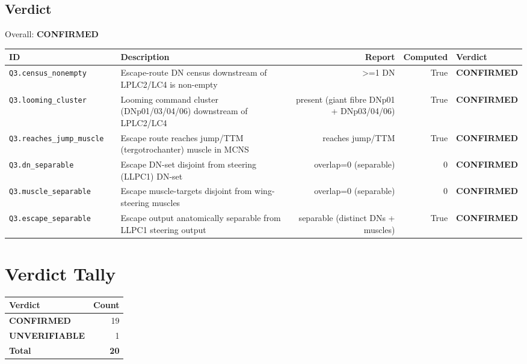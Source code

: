 \documentclass[11pt]{article}
\begin{document}
\subsection*{Verdict}
\noindent Overall: \textcolor{vgreen}{\textbf{CONFIRMED}}\par\medskip
\begin{longtable}{@{}llp{}rrl@{}}
\toprule
\textbf{ID} & & \textbf{Description} & \textbf{Report} & \textbf{Computed} & \textbf{Verdict} \\
\midrule
\endhead
\texttt{Q3.census\_nonempty} & & Escape-route DN census downstream of LPLC2/LC4 is non-empty & >=1 DN & True & \textcolor{vgreen}{\textbf{CONFIRMED}} \\
\texttt{Q3.looming\_cluster} & & Looming command cluster (DNp01/03/04/06) downstream of LPLC2/LC4 & present (giant fibre DNp01 + DNp03/04/06) & True & \textcolor{vgreen}{\textbf{CONFIRMED}} \\
\texttt{Q3.reaches\_jump\_muscle} & & Escape route reaches jump/TTM (tergotrochanter) muscle in MCNS & reaches jump/TTM & True & \textcolor{vgreen}{\textbf{CONFIRMED}} \\
\texttt{Q3.dn\_separable} & & Escape DN-set disjoint from steering (LLPC1) DN-set & overlap=0 (separable) & 0 & \textcolor{vgreen}{\textbf{CONFIRMED}} \\
\texttt{Q3.muscle\_separable} & & Escape muscle-targets disjoint from wing-steering muscles & overlap=0 (separable) & 0 & \textcolor{vgreen}{\textbf{CONFIRMED}} \\
\texttt{Q3.escape\_separable} & & Escape output anatomically separable from LLPC1 steering output & separable (distinct DNs + muscles) & True & \textcolor{vgreen}{\textbf{CONFIRMED}} \\
\bottomrule
\end{longtable}

\section{Verdict Tally}

\begin{longtable}{@{}lr@{}}
\toprule
\textbf{Verdict} & \textbf{Count} \\
\midrule
\endhead
\textcolor{vgreen}{\textbf{CONFIRMED}} & 19 \\
\textcolor{vgray}{\textbf{UNVERIFIABLE}} & 1 \\
\midrule
\textbf{Total} & \textbf{20} \\
\bottomrule
\end{longtable}
\end{document}
